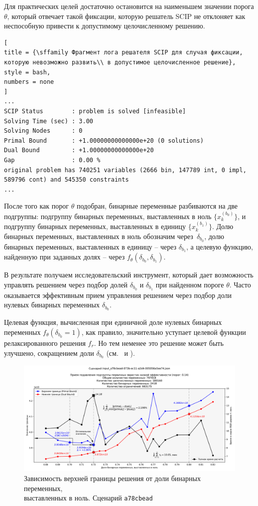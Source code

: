 \documentclass[%
	11pt,
	a4paper,
	utf8,
		]{article}
\begin{document}
Для практических целей достаточно остановится на наименьшем значении порога $ \theta $, который отвечает такой фиксации, которую решатель SCIP не отклоняет как неспособную привести к допустимому целочисленному решению.
\begin{lstlisting}[
title = {\sffamily Фрагмент лога решателя SCIP для случая фиксации, которую невозможно развить\\ в допустимое целочисленное решение},
style = bash,
numbers = none	
]
...
SCIP Status        : problem is solved [infeasible]
Solving Time (sec) : 3.00
Solving Nodes      : 0
Primal Bound       : +1.00000000000000e+20 (0 solutions)
Dual Bound         : +1.00000000000000e+20
Gap                : 0.00 %
original problem has 740251 variables (2666 bin, 147789 int, 0 impl, 589796 cont) and 545350 constraints
...
\end{lstlisting}

После того как порог $ \theta $ подобран, бинарные переменные разбиваются на две подгруппы: подгруппу бинарных переменных, выставленных в ноль $ \{x_k^{(b_0)}\} $, и подгруппу бинарных переменных, выставленных в единицу $ \{ x_k^{(b_1)} \} $. Долю бинарных переменных, выставленных в ноль обозначим через~$ \delta_{b_0} $, долю бинарных переменных, выставленных в единицу -- через $ \delta_{b_1} $, а целевую функцию, найденную при заданных долях -- через $ f_{\theta}(\delta_{b_0}, \delta_{b_1}) $.

В результате получаем исследовательский инструмент, который дает возможность управлять решением через подбор долей $ \delta_{b_0} $ и $ \delta_{b_1} $ при найденном пороге $ \theta $. Часто оказывается эффективным прием управления решением через подбор доли нулевых бинарных переменных $ \delta_{b_0} $.

Целевая функция, вычисленная при единичной доле нулевых бинарных переменных $ f_{\theta}(\delta_{b_0}=1) $, как правило, значительно уступает целевой функции релаксированного решения $ f_r $. Но тем неменее это решение может быть улучшено, сокращением доли $ \delta_{b_0} $ (см.~ и ).

\begin{figure}[!h]
	\centering
	\includegraphics[scale=0.45]{figures/a78cbead_frac_bin_zeros.pdf}
	\caption{ Зависимость верхней границы решения от доли бинарных переменных, \\выставленных в ноль. Сценарий \texttt{a78cbead} }\label{fig:a78cbeadfracbinzeros}
\end{figure}
\end{document}
